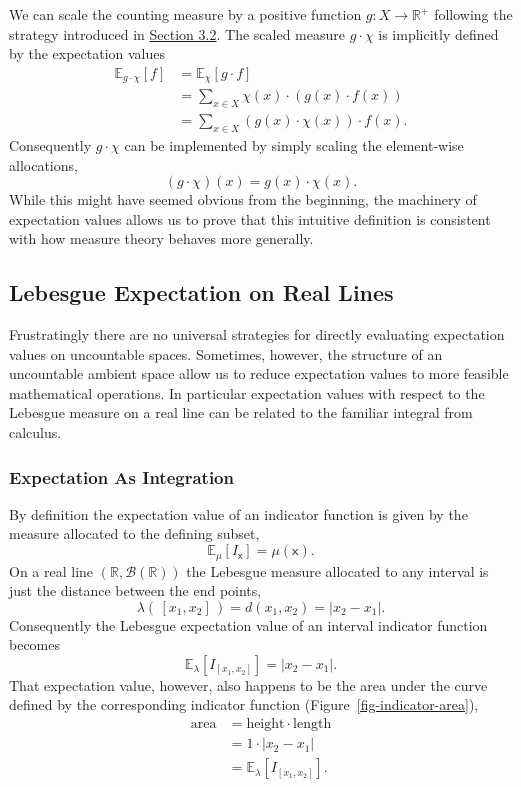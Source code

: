 \documentclass[
  letterpaper,
  DIV=11,
  numbers=noendperiod]{scrartcl}
\begin{document}
We can scale the counting measure by a positive function
\(g : X \rightarrow \mathbb{R}^{+}\) following the strategy introduced
in \href{@sec:scaling-measures}{Section 3.2}. The scaled measure
\(g \cdot \chi\) is implicitly defined by the expectation values
\begin{align*}
\mathbb{E}_{g \cdot \chi}[f]
&=
\mathbb{E}_{\chi}[g \cdot f]
\\
&=
\sum_{x \in X} \chi(x) \cdot \left( g(x) \cdot f(x) \right)
\\
&=
\sum_{x \in X} \left( g(x) \cdot \chi(x) \right) \cdot f(x).
\end{align*} Consequently \(g \cdot \chi\) can be implemented by simply
scaling the element-wise allocations, \[
(g \cdot \chi)(x) = g(x) \cdot \chi(x).
\] While this might have seemed obvious from the beginning, the
machinery of expectation values allows us to prove that this intuitive
definition is consistent with how measure theory behaves more generally.

\hypertarget{sec:expectation_as_integration}{%
\subsection{Lebesgue Expectation on Real
Lines}\label{sec:expectation_as_integration}}

Frustratingly there are no universal strategies for directly evaluating
expectation values on uncountable spaces. Sometimes, however, the
structure of an uncountable ambient space allow us to reduce expectation
values to more feasible mathematical operations. In particular
expectation values with respect to the Lebesgue measure on a real line
can be related to the familiar integral from calculus.

\hypertarget{expectation-as-integration}{%
\subsubsection{Expectation As
Integration}\label{expectation-as-integration}}

By definition the expectation value of an indicator function is given by
the measure allocated to the defining subset, \[
\mathbb{E}_{\mu}[I_{\mathsf{x}}] = \mu(\mathsf{x}).
\] On a real line \((\mathbb{R}, \mathcal{B}(\mathbb{R}))\) the Lebesgue
measure allocated to any interval is just the distance between the end
points, \[
\lambda( \, [x_{1}, x_{2}] \, ) = d(x_{1}, x_{2}) = | x_{2} - x_{1} |.
\] Consequently the Lebesgue expectation value of an interval indicator
function becomes \[
\mathbb{E}_{\lambda}[I_{[x_{1}, x_{2}]}]
=
| x_{2} - x_{1} |.
\] That expectation value, however, also happens to be the area under
the curve defined by the corresponding indicator function
(Figure~\ref{fig-indicator-area}), \begin{align*}
\text{area}
&= \text{height} \cdot \text{length}
\\
&= 1 \cdot | x_{2} - x_{1} |
\\
&= \mathbb{E}_{\lambda}[I_{[x_{1}, x_{2}]}].
\end{align*}
\end{document}
